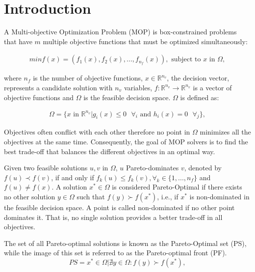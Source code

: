 \section{Introduction}

A Multi-objective Optimization Problem (MOP)  is box-constrained problems that have $m$ multiple objective functions that must be optimized simultaneously:

\begin{align}\label{min_problem}
min f(x) = (f_1(x), f_2(x), ..., f_{n_f}(x)), \text{ subject to $x$ in $\Omega$},
\end{align}

where ${n_f}$ is the number of objective functions, $x \in \mathbb{R}^{n_v}$, the decision vector, represents a candidate solution with ${n_v}$ variables, $f: \mathbb{R}^{n_v} \rightarrow \mathbb{R}^{n_v}$ is a vector of objective functions and $\Omega$ is the feasible decision space. $\Omega$ is defined as:

\begin{align}
	\Omega =\{x \text{ in } \mathbb{R}^{n_v} | g_i(x) \leq 0 \text{ } \forall_i \text{ and } h_i(x) = 0 \text{ } \forall_j \},
\end{align}

Objectives often conflict with each other therefore no point in $\Omega$ minimizes all the objectives at the same time. Consequently, the goal of MOP solvers is to find the best trade-off that balances the different objectives in an optimal way.


Given two feasible solutions $u, v$ in $\Omega$, $u$  Pareto-dominates $v$, denoted by $f(u) \prec f(v)$, if and only if $f_k(u) \leq f_k(v), \forall_k \in \{1,..., n_f\}$ and $ f(u) \neq f(x)$. A solution $x^* \in \Omega$ is considered Pareto-Optimal if there exists no other solution $y \in \Omega$ such that $f(y) \succ f(x^*)$, i.e., if $x^*$ is non-dominated in the feasible decision space. A point is called non-dominated if no other point dominates it. That is, no single solution provides a better trade-off in all objectives.

The set of all Pareto-optimal solutions is known as the Pareto-Optimal set (PS), while the image of this set is referred to as the Pareto-optimal front (PF).\\

\begin{equation}
	PS = {x^* \in \Omega | \nexists y \in \Omega : f(y) \succ f(x^*)  },
\end{equation}

